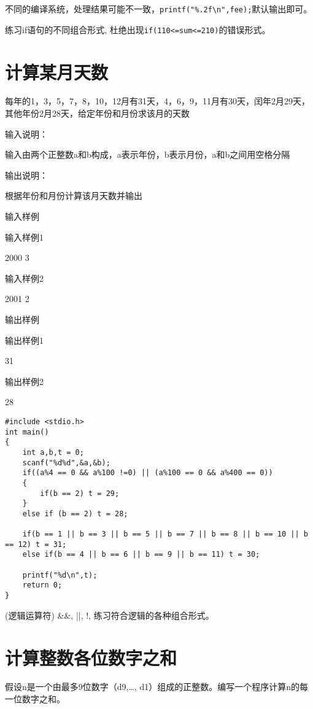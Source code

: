 \begin{note}[四舍五入问题]
	不同的编译系统，处理结果可能不一致，\lstinline|printf("%.2f\n",fee);|默认输出即可。
\end{note}

\begin{note}
	练习if语句的不同组合形式, 杜绝出现\lstinline|if(110<=sum<=210)|的错误形式。
\end{note}

\section{计算某月天数}
每年的1，3，5，7，8，10，12月有31天，4，6，9，11月有30天，闰年2月29天，其他年份2月28天，给定年份和月份求该月的天数

输入说明：

输入由两个正整数a和b构成，a表示年份，b表示月份，a和b之间用空格分隔

输出说明：

根据年份和月份计算该月天数并输出

输入样例	

输入样例1

2000 3

输入样例2

2001 2

输出样例
	
输出样例1

31

输出样例2

28

\begin{lstlisting}
#include <stdio.h>
int main()
{
	int a,b,t = 0;
	scanf("%d%d",&a,&b);
	if((a%4 == 0 && a%100 !=0) || (a%100 == 0 && a%400 == 0))
	{
		if(b == 2) t = 29;
	}
	else if (b == 2) t = 28;
	
	if(b == 1 || b == 3 || b == 5 || b == 7 || b == 8 || b == 10 || b == 12) t = 31;
	else if(b == 4 || b == 6 || b == 9 || b == 11) t = 30; 
	
	printf("%d\n",t);
	return 0;	
}
\end{lstlisting}

\begin{note}(逻辑运算符)
	\&\&, ||, !, 练习符合逻辑的各种组合形式。
\end{note}

\section{计算整数各位数字之和}
假设n是一个由最多9位数字（d9,\dots, d1）组成的正整数。编写一个程序计算n的每一位数字之和。

